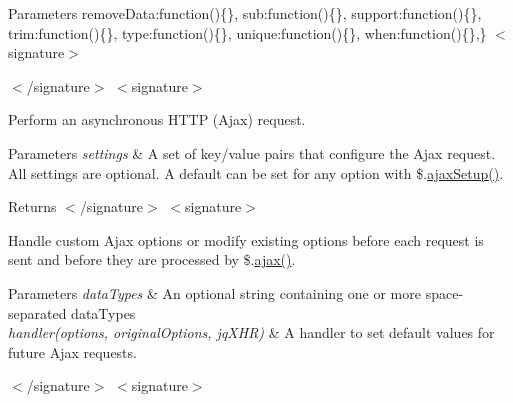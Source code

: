 \begin{DoxyParams}{Parameters}
\textquotesingle{}remove\+Data\textquotesingle{}\+:function()\{\}, \textquotesingle{}sub\textquotesingle{}\+:function()\{\}, \textquotesingle{}support\textquotesingle{}\+:function()\{\}, \textquotesingle{}trim\textquotesingle{}\+:function()\{\}, \textquotesingle{}type\textquotesingle{}\+:function()\{\}, \textquotesingle{}unique\textquotesingle{}\+:function()\{\}, \textquotesingle{}when\textquotesingle{}\+:function()\{\},\} $<$signature$>$ 
 $<$/signature$>$ $<$signature$>$ \\
\hline
\end{DoxyParams}
Perform an asynchronous H\+T\+TP (Ajax) request.


\begin{DoxyParams}{Parameters}
{\em settings} & A set of key/value pairs that configure the Ajax request. All settings are optional. A default can be set for any option with \$.\hyperlink{obj_2_release_2_package_2_package_tmp_2_scripts_2jquery-1_810_82_8js_a52a40924d02e0d9756f051e36a640cd6}{ajax\+Setup()}.\\
\hline
\end{DoxyParams}
\begin{DoxyReturn}{Returns}
$<$/signature$>$ $<$signature$>$ 

Handle custom Ajax options or modify existing options before each request is sent and before they are processed by \$.\hyperlink{obj_2_release_2_package_2_package_tmp_2_scripts_2jquery_8validate_8js_a77004c0fdc08a5bc07afa0b099cdf6df}{ajax()}.
\end{DoxyReturn}

\begin{DoxyParams}{Parameters}
{\em data\+Types} & An optional string containing one or more space-\/separated data\+Types\\
\hline
{\em handler(options, original\+Options, jq\+X\+H\+R)} & A handler to set default values for future Ajax requests.\\
\hline
\end{DoxyParams}
$<$/signature$>$ $<$signature$>$ 

